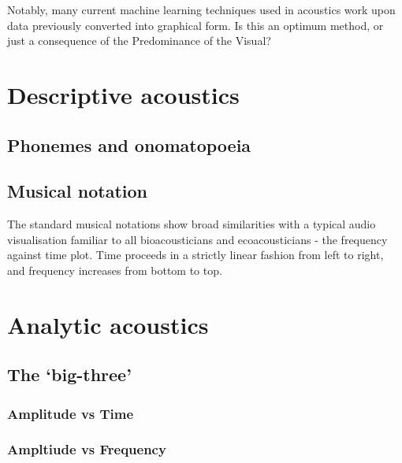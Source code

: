 \documentclass[
]{book}
\begin{document}
Notably, many current machine learning techniques used in acoustics work upon data previously converted into graphical form. Is this an optimum method, or just a consequence of the Predominance of the Visual?

\hypertarget{descriptive-acoustics}{%
\section{Descriptive acoustics}\label{descriptive-acoustics}}

\hypertarget{phonemes-and-onomatopoeia}{%
\subsection{Phonemes and onomatopoeia}\label{phonemes-and-onomatopoeia}}

\hypertarget{musical-notation}{%
\subsection{Musical notation}\label{musical-notation}}

The standard musical notations show broad similarities with a typical audio visualisation familiar to all bioacousticians and ecoacousticians - the frequency against time plot. Time proceeds in a strictly linear fashion from left to right, and frequency increases from bottom to top.

\hypertarget{analytic-acoustics}{%
\section{Analytic acoustics}\label{analytic-acoustics}}

\hypertarget{the-big-three}{%
\subsection{The `big-three'}\label{the-big-three}}

\hypertarget{amplitude-vs-time}{%
\subsubsection{Amplitude vs Time}\label{amplitude-vs-time}}

\hypertarget{ampltiude-vs-frequency}{%
\subsubsection{Ampltiude vs Frequency}\label{ampltiude-vs-frequency}}
\end{document}
